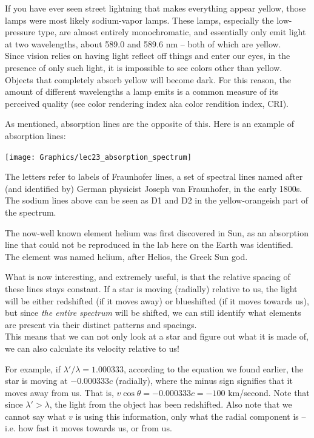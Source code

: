 \documentclass[8.01x]{subfiles}
\begin{document}
If you have ever seen street lightning that makes everything appear yellow, those lamps were most likely sodium-vapor lamps. These lamps, especially the low-pressure type, are almost entirely monochromatic, and essentially only emit light at two wavelengths, about 589.0 and 589.6 nm -- both of which are yellow.\\
Since vision relies on having light reflect off things and enter our eyes, in the presence of only such light, it is impossible to see colors other than yellow. Objects that completely absorb yellow will become dark. For this reason, the amount of different wavelengths a lamp emits is a common measure of its perceived quality (see color rendering index aka color rendition index, CRI).

As mentioned, absorption lines are the opposite of this. Here is an example of absorption lines:

\begin{center}
\texttt{[image: Graphics/lec23\_absorption\_spectrum]}
\end{center}

The letters refer to labels of Fraunhofer lines, a set of spectral lines named after (and identified by) German physicist Joseph van Fraunhofer, in the early 1800s. The sodium lines above can be seen as D1 and D2 in the yellow-orangeish part of the spectrum.

The now-well known element helium was first discovered in Sun, as an absorption line that could not be reproduced in the lab here on the Earth was identified. The element was named  helium, after Helios, the Greek Sun god.

What is now interesting, and extremely useful, is that the relative spacing of these lines stays constant. If a star is moving (radially) relative to us, the light will be either redshifted (if it moves away) or blueshifted (if it moves towards us), but since \emph{the entire spectrum} will be shifted, we can still identify what elements are present via their distinct patterns and spacings.\\
This means that we can not only look at a star and figure out what it is made of, we can also calculate its velocity relative to us!

For example, if $\lambda'/\lambda = 1.000333$, according to the equation we found earlier, the star is moving at $-0.000333 c$ (radially), where the minus sign signifies that it moves away from us. That is, $v \cos \theta = -0.000333c = -100$ km/second. Note that since $\lambda' > \lambda$, the light from the object has been redshifted. Also note that we cannot say what $v$ is using this information, only what the radial component is -- i.e. how fast it moves towards us, or from us.
\end{document}
